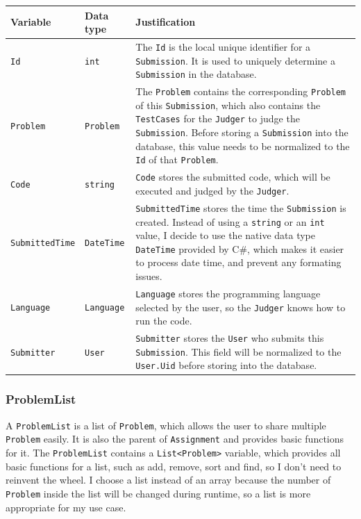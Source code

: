 \documentclass[a4paper]{report}
\begin{document}
\begin{tabulary}{\textwidth}{|l|l|L|}
    \hline
    Variable & Data type & Justification \\
    \hline
    \verb|Id| & \verb|int| & The \verb|Id| is the local unique identifier for a \verb|Submission|. It is used to uniquely determine a \verb|Submission| in the database. \\
    \hline
    \verb|Problem| & \verb|Problem| & The \verb|Problem| contains the corresponding \verb|Problem| of this \verb|Submission|, which also contains the \verb|TestCases| for the \verb|Judger| to judge the \verb|Submission|. Before storing a \verb|Submission| into the database, this value needs to be normalized to the \verb|Id| of that \verb|Problem|. \\
    \hline
    \verb|Code| & \verb|string| & \verb|Code| stores the submitted code, which will be executed and judged by the \verb|Judger|. \\
    \hline
    \verb|SubmittedTime| & \verb|DateTime| & \verb|SubmittedTime| stores the time the \verb|Submission| is created. Instead of using a \verb|string| or an \verb|int| value, I decide to use the native data type \verb|DateTime| provided by C\#, which makes it easier to process date time, and prevent any formating issues. \\
    \hline
    \verb|Language| & \verb|Language| & \verb|Language| stores the programming language selected by the user, so the \verb|Judger| knows how to run the code.\\
    \hline
    \verb|Submitter| & \verb|User| & \verb|Submitter| stores the \verb|User| who submits this \verb|Submission|. This field will be normalized to the \verb|User.Uid| before storing into the database. \\
    \hline
\end{tabulary}

\subsubsection{ProblemList}

A \verb|ProblemList| is a list of \verb|Problem|, which allows the user to share multiple \verb|Problem| easily. It is also the parent of \verb|Assignment| and provides basic functions for it. The \verb|ProblemList| contains a \verb|List<Problem>| variable, which provides all basic functions for a list, such as add, remove, sort and find, so I don't need to reinvent the wheel. I choose a list instead of an array because the number of \verb|Problem| inside the list will be changed during runtime, so a list is more appropriate for my use case.
\end{document}
